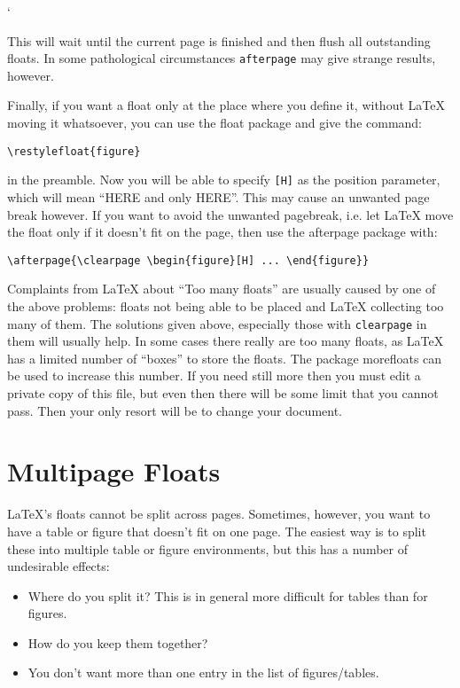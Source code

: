`\documentclass[a4paper]{article}
\def\latex/{\protect\LaTeX{}}
\newcommand{\bs}{\symbol{'134}}
\newcommand{\Cmd}[1]{\texttt{\def\{{\char`\{}\def\}{\char`\}}\bs#1}}
\begin{document}
This will wait until the current page is finished and then flush all
outstanding floats. In some pathological circumstances \texttt{afterpage}
may give strange results, however.

Finally, if you want a float only at the place where you define it, without
\latex/ moving it whatsoever, you can use the \textsf{float} package and
give the command:
\begin{verbatim}
\restylefloat{figure}
\end{verbatim}
 in the preamble. Now you will be able to
specify \texttt{[H]} as the position parameter, which will mean ``HERE and only
HERE''. This may cause an unwanted page break however. 
If you want to avoid the unwanted pagebreak, i.e. let
\LaTeX{} move the float only if it doesn't fit on the page, then use the
\textsf{afterpage} package with:
\begin{verbatim}
\afterpage{\clearpage \begin{figure}[H] ... \end{figure}}
\end{verbatim}

Complaints from \latex/ about ``Too many floats'' are usually caused by one
of the above problems: floats not being able to be placed and \latex/
collecting too many of them. The solutions given above, especially those
with \Cmd{clearpage} in them will usually help. In some cases there
really are too many floats, as \latex/ has a limited number of ``boxes'' to
store the floats. The package \textsf{morefloats} can be used to increase
this number. If you need still more then you must edit a private copy of
this file, but even then there will be some limit that you cannot pass.
Then your only resort will be to change your document.

\section{Multipage Floats}

\LaTeX's floats cannot be split across pages. Sometimes, however, you want
to have a table or figure that doesn't fit on one page. The easiest way is
to split these into multiple table or figure environments, but this has a
number of undesirable effects:
\begin{itemize}
\item Where do you split it? This is in general more difficult for tables
  than for figures.
\item How do you keep them together?
\item You don't want more than one entry in the list of figures/tables.
\end{itemize}
\end{document}
